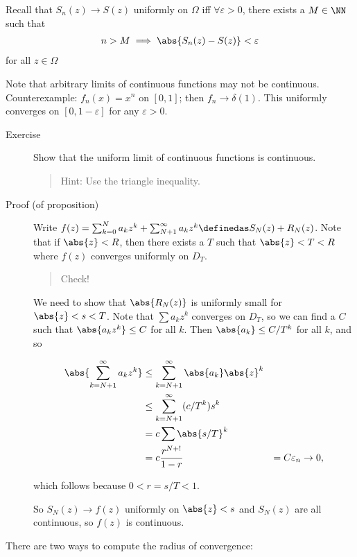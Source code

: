 Recall that \(S_n(z) \to S(z)\) uniformly on \(\Omega\) iff
\(\forall \varepsilon > 0\), there exists a \(M\in \NN\) such that
\begin{align*}n> M \implies \abs{S_n(z) - S(z)} < \varepsilon\end{align*}
for all \(z\in \Omega\)

Note that arbitrary limits of continuous functions may not be
continuous. Counterexample: \(f_n(x) = x^n\) on \([0, 1]\); then
\(f_n \to \delta(1)\). This uniformly converges on
\([0, 1-\varepsilon]\) for any \(\varepsilon > 0\).

\begin{description}
\item[Exercise]
Show that the uniform limit of continuous functions is continuous.

\begin{quote}
Hint: Use the triangle inequality.
\end{quote}
\item[Proof (of proposition)]
Write
\(f(z) = \sum_{k=0}^N a_k z^k + \sum_{N+1}^\infty a_k z^k \definedas S_N(z) + R_N(z)\).
Note that if \(\abs{z} < R\), then there exists a \(T\) such that
\(\abs{z} < T < R\) where \(f(z)\) converges uniformly on \(D_T\).

\begin{quote}
Check!
\end{quote}

We need to show that \(\abs{R_N(z)}\) is uniformly small for
\(\abs{z} < s < T\). Note that \(\sum a_k z^k\) converges on \(D_T\), so
we can find a \(C\) such that \(\abs{a_k z^k} \leq C\) for all \(k\).
Then \(\abs{a_k} \leq C/T^k\) for all \(k\), and so

\begin{align*}
\abs{\sum_{k=N+1}^\infty a_k z^k}
&\leq \sum_{k=N+1}^\infty \abs{a_k} \abs{z}^k \\
&\leq \sum_{k=N+1}^\infty  (c/T^k) s^k \\
&= c\sum \abs{s/T}^k \\
&= c \frac{r^{N+!}}{1-r}
&= C \varepsilon_n \to 0
,\end{align*}

which follows because \(0 < r = s/T < 1\).

So \(S_N(z) \to f(z)\) uniformly on \(\abs{z} < s\) and \(S_N(z)\) are
all continuous, so \(f(z)\) is continuous.
\end{description}

There are two ways to compute the radius of convergence:

